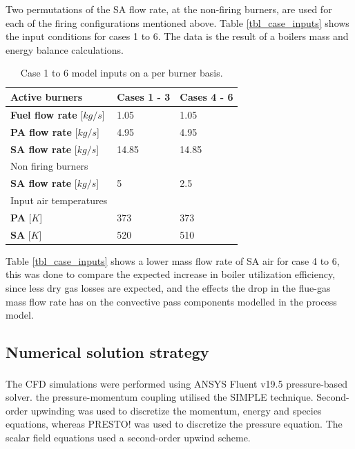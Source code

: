 \documentclass[review]{elsarticle}
\begin{document}
Two permutations of the SA flow rate, at the non-firing burners, are used for each of the firing configurations mentioned above. Table \ref{tbl_case_inputs} shows the input conditions for cases 1 to 6. The data is the result of a boilers mass and energy balance calculations.

\begin{table}[h!]
\centering
\caption{Case 1 to 6 model inputs on a per burner basis.}
\label{tbl_case_inputs}
\vspace{5mm}
\label{fuel}
{\tabulinesep=1.2mm
\begin{tabularx}{\textwidth}{p{} p{} l}
\hline
Active burners & \textbf{Cases 1 - 3} & \textbf{Cases 4 - 6}\\
\hline
\textbf{Fuel flow rate} [$kg/s$]&1.05  &1.05\\
\textbf{PA flow rate} [$kg/s$]&4.95  &4.95\\
\textbf{SA flow rate} [$kg/s$]&14.85  &14.85\\
\hline
Non firing burners &  & \\
\hline
\textbf{SA flow rate} [$kg/s$]&5  &2.5\\
\hline
Input air temperatures& &\\
\hline
\textbf{PA} [$K$]&373  &373\\
\textbf{SA} [$K$]&520  &510\\
\hline
\end{tabularx}}
\end{table}

Table \ref{tbl_case_inputs} shows a lower mass flow rate of SA air for case 4 to 6, this was done to compare the expected increase in boiler utilization efficiency, since less dry gas losses are expected, and the effects the drop in the flue-gas mass flow rate has on the convective pass components modelled in the process model. 

\subsection{Numerical solution strategy} 

The CFD simulations were performed using ANSYS Fluent v19.5\textsuperscript{\textregistered} pressure-based solver. the pressure-momentum coupling utilised the SIMPLE technique. Second-order upwinding was used to discretize the momentum, energy and species equations, whereas PRESTO! was used to discretize the pressure equation. The scalar field equations used a second-order upwind scheme.
\end{document}

